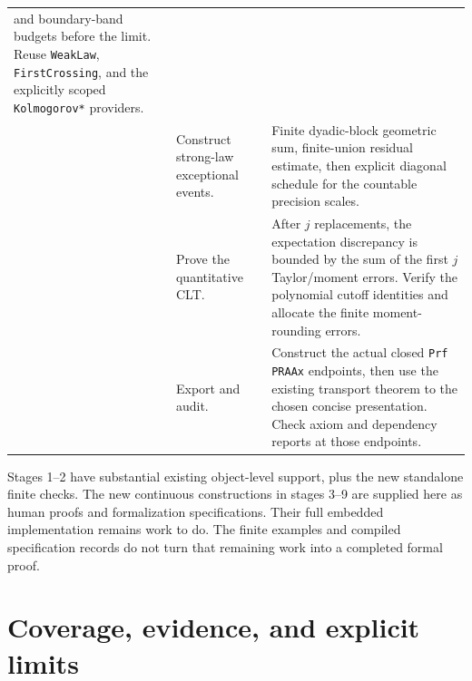 \begin{longtable}{>{\raggedright\arraybackslash}p{}>{\raggedright\arraybackslash}p{}>{\raggedright\arraybackslash}p{}}
and boundary-band budgets before the limit. Reuse \texttt{WeakLaw},
\texttt{FirstCrossing}, and the explicitly scoped \texttt{Kolmogorov*} providers.\\
8 & Construct strong-law exceptional events. &
Finite dyadic-block geometric sum, finite-union residual estimate,
then explicit diagonal schedule for the countable precision scales.\\
9 & Prove the quantitative CLT. &
After $j$ replacements, the expectation discrepancy is bounded by the
sum of the first $j$ Taylor/moment errors. Verify the polynomial cutoff
identities and allocate the finite moment-rounding errors.\\
10 & Export and audit. &
Construct the actual closed \texttt{Prf PRAAx} endpoints, then use the
existing transport theorem to the chosen concise presentation. Check
axiom and dependency reports at those endpoints.\\
\bottomrule
\end{longtable}

Stages 1--2 have substantial existing object-level support, plus the new
standalone finite checks. The new continuous constructions in stages 3--9
are supplied here as human proofs and formalization specifications. Their
full embedded implementation remains work to do. The finite examples and
compiled specification records do not turn that remaining work into a
completed formal proof.

\clearpage
\section{Coverage, evidence, and explicit limits}
\label{sec:coverage}

